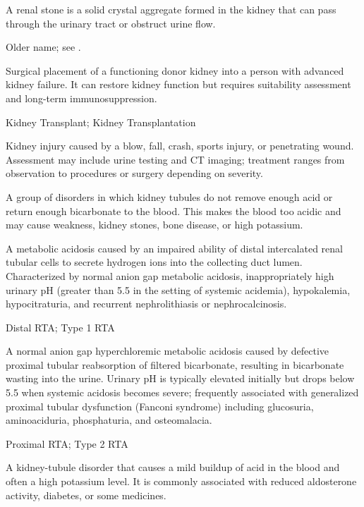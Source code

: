  A renal stone is a solid crystal aggregate formed in the kidney that can pass through the urinary tract or obstruct urine flow.

 Older name; see .

 Surgical placement of a functioning donor kidney into a person with advanced kidney failure. It can restore
kidney function but requires suitability assessment and long-term immunosuppression.

\synonyms
Kidney Transplant; Kidney Transplantation

 Kidney injury caused by a blow, fall, crash, sports injury, or penetrating wound. Assessment may include urine testing and CT imaging; treatment ranges from observation to procedures or surgery depending on severity.

 A group of disorders in which kidney tubules do not remove enough acid or return enough bicarbonate to the blood. This makes the blood too acidic and may cause weakness, kidney stones, bone disease, or high potassium.

 A metabolic acidosis caused by an impaired ability of distal intercalated renal tubular cells to secrete hydrogen ions into the collecting duct lumen. Characterized by normal anion gap metabolic acidosis, inappropriately high urinary pH (greater than 5.5 in the setting of systemic acidemia), hypokalemia, hypocitraturia, and recurrent nephrolithiasis or nephrocalcinosis.

\synonyms
Distal RTA; Type 1 RTA

 A normal anion gap hyperchloremic metabolic acidosis caused by defective proximal tubular reabsorption of filtered bicarbonate, resulting in bicarbonate wasting into the urine. Urinary pH is typically elevated initially but drops below 5.5 when systemic acidosis becomes severe; frequently associated with generalized proximal tubular dysfunction (Fanconi syndrome) including glucosuria, aminoaciduria, phosphaturia, and osteomalacia.

\synonyms
Proximal RTA; Type 2 RTA

 A kidney-tubule disorder that causes a mild buildup of acid in the blood and often a high potassium level. It is commonly associated with reduced aldosterone activity, diabetes, or some medicines.

